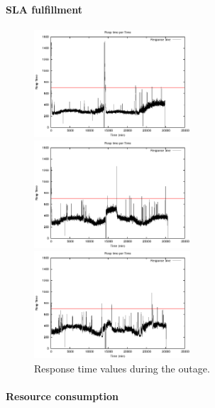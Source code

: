 \paragraph{SLA fulfillment}


\begin{figure}[htb]
	\begin{minipage}[b]{0.32\linewidth}
		\includegraphics[height=4cm]{images/exps2011/low/das/proxyDataPoints_output.eps}	
		\vspace{-4mm}
	\end{minipage}
	\hfill
	\begin{minipage}[b]{0.32\linewidth}
		\includegraphics[height=4cm]{images/exps2011/medium/das/proxyDataPoints_output.eps}
		\vspace{-4mm}
	\end{minipage}
\hfill
\begin{minipage}[b]{0.32\linewidth}
		\includegraphics[height=4cm]{images/exps2011/high/das/proxyDataPoints_output.eps}
		\vspace{-4mm}
	\end{minipage}
\caption{Response time values during the outage.}
\label{fig:EC2ResponseTime}
\end{figure}


\paragraph{Resource consumption}

